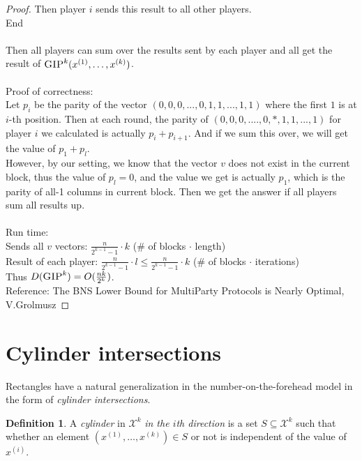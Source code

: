 \documentclass[11pt,oneside]{book}
\theoremstyle{plain}
\theoremstyle{definition}
\newtheorem{definition}{Definition}
\theoremstyle{plain}
\newcommand{\calX}{\mathcal{X}}
\newcommand{\GIP}{\textsc{GIP}}
\begin{document}
\begin{proof}
		\hspace*{10mm}Then player $i$ sends this result to all other players.\\
		End\\
		\\
		Then all players can sum over the results sent by each player and all get the result of $\GIP^k(x^{(1)},\ldots,x^{(k)})$.\\
		\\
		Proof of correctness: \\
		Let $p_i$ be the parity of the vector $(0,0,0,...,0,1,1,...,1,1)$ where the first $1$ is at $i$-th position. Then at each round, the parity of $(0,0,0,....,0,*,1,1,...,1)$ for player $i$ we calculated is actually $p_i + p_{i+1}$. And if we sum this over, we will get the value of $p_1 + p_l$.\\
		However, by our setting, we know that the vector $v$ does not exist in the current block, thus the value of $p_l = 0$, and the value we get is actually $p_1$, which is the parity of all-1 columns in current block. Then we get the answer if all players sum all results up.\\
		\\
		Run time:\\
		Sends all $v$ vectors: $\frac{n}{2^{k-1}-1} \cdot k$ ($\#$ of blocks $\cdot$ length)\\
		Result of each player: $\frac{n}{2^{k-1}-1} \cdot l \leq \frac{n}{2^{k-1}-1} \cdot k$ ($\#$ of blocks $\cdot$ iterations)\\
		Thus $D(\GIP^k) = O(\frac{nk}{2^k})$.\\
		Reference: The BNS Lower Bound for Multi\-Party Protocols is Nearly Optimal, V.Grolmusz
	\end{proof}
	
	
	
	 
	\section{Cylinder intersections}
	
	Rectangles have a natural generalization in the number-on-the-forehead model in the form of \emph{cylinder intersections}.
	
	\begin{definition}
		A \emph{cylinder} in $\calX^k$ \emph{in the $i$th direction} is a set $S \subseteq \calX^k$ such that whether an element $(x^{(1)},\ldots,x^{(k)}) \in S$ or not is independent of the value of $x^{(i)}$.
	\end{definition}
	
\end{document}
